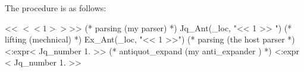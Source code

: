 \inputminted[fontsize=\scriptsize, fontsize=\scriptsize, firstline=57,lastline=125]{ocaml}{camlp4/code/jake/json_ant.ml}




The procedure is as follows:

\begin{ocamlcode}
<< $ << 1 >> $>>  (* parsing (my parser) *)
Jq_Ant(_loc, "<< 1 >> ") (* lifting  (mechnical) *)
Ex_Ant(_loc, "<< 1 >>") (* parsing  (the host parser *)
<:expr< Jq_number 1. >>   (* antiquot_expand (my anti_expander ) *)
<:expr < Jq_number 1. >> 
\end{ocamlcode}








